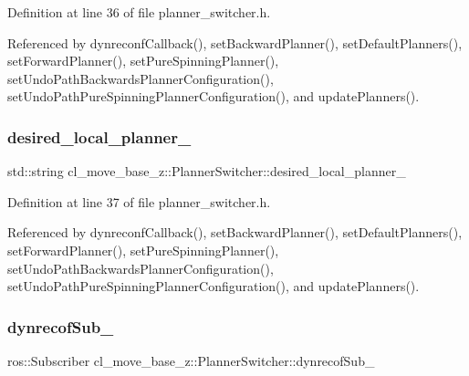 Definition at line 36 of file planner\+\_\+switcher.\+h.



Referenced by dynreconf\+Callback(), set\+Backward\+Planner(), set\+Default\+Planners(), set\+Forward\+Planner(), set\+Pure\+Spinning\+Planner(), set\+Undo\+Path\+Backwards\+Planner\+Configuration(), set\+Undo\+Path\+Pure\+Spinning\+Planner\+Configuration(), and update\+Planners().

\mbox{\label{classcl__move__base__z_1_1PlannerSwitcher_a6cbf65f11bb69125f913caaabdf7b4cf}} 
\subsubsection{\texorpdfstring{desired\+\_\+local\+\_\+planner\+\_\+}{desired\_local\_planner\_}}
{\footnotesize\ttfamily std\+::string cl\+\_\+move\+\_\+base\+\_\+z\+::\+Planner\+Switcher\+::desired\+\_\+local\+\_\+planner\+\_\+\hspace{0.3cm}{\ttfamily [private]}}



Definition at line 37 of file planner\+\_\+switcher.\+h.



Referenced by dynreconf\+Callback(), set\+Backward\+Planner(), set\+Default\+Planners(), set\+Forward\+Planner(), set\+Pure\+Spinning\+Planner(), set\+Undo\+Path\+Backwards\+Planner\+Configuration(), set\+Undo\+Path\+Pure\+Spinning\+Planner\+Configuration(), and update\+Planners().

\mbox{\label{classcl__move__base__z_1_1PlannerSwitcher_ae902346f4f8e58241acc56cccaad8546}} 
\subsubsection{\texorpdfstring{dynrecof\+Sub\+\_\+}{dynrecofSub\_}}
{\footnotesize\ttfamily ros\+::\+Subscriber cl\+\_\+move\+\_\+base\+\_\+z\+::\+Planner\+Switcher\+::dynrecof\+Sub\+\_\+\hspace{0.3cm}{\ttfamily [private]}}



